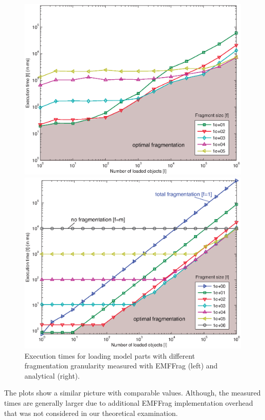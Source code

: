 \begin{figure}[t]
\begin{minipage}[b]{0.48\linewidth}
\centering
\includegraphics[width=\linewidth]{figures/measureTimesExtra}
\end{minipage}
\hspace{0.02\linewidth}
\begin{minipage}[b]{0.48\linewidth}
\centering
\includegraphics[width=\linewidth]{figures/theoryTimesSmallWO}
\end{minipage}
\caption{Execution times for loading model parts with different fragmentation granularity measured with EMFFrag (left) and analytical (right).}
\label{fig:measureTimeExtra}
\end{figure}
%

The plots show a similar picture with comparable values. Although, the measured times are generally larger due to additional EMFFrag implementation overhead that was not considered in our theoretical examination.